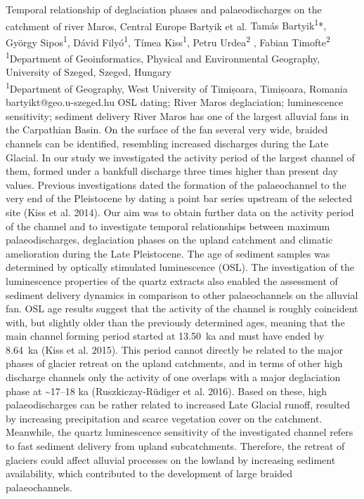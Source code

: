 \abstract
{Temporal relationship of deglaciation phases and palaeodischarges on the catchment of river Maros, Central Europe} %
{Bartyik et al.} %
{Tamás Bartyik\textsuperscript{1}*, György Sipos\textsuperscript{1}, Dávid Filyó\textsuperscript{1}, Tímea Kiss\textsuperscript{1}, Petru Urdea\textsuperscript{2} , Fabian Timofte\textsuperscript{2}} %
{\TLtag} %
{\textsuperscript{1}Department of Geoinformatics, Physical and Environmental Geography, University of Szeged, Szeged, Hungary\\
\textsuperscript{1}Department of Geography, West University of Timișoara, Timișoara, Romania
} %
{bartyikt@geo.u-szeged.hu}  %
{OSL dating; River Maros deglaciation; luminescence sensitivity; sediment delivery}%
{River Maros has one of the largest alluvial fans in the Carpathian Basin. On the surface of the fan several very wide, braided channels can be identified, resembling increased discharges during the Late Glacial. In our study we investigated the activity period of the largest channel of them, formed under a bankfull discharge three times higher than present day values. Previous investigations dated the formation of the palaeochannel to the very end of the Pleistocene by dating a point bar series upstream of the selected site (Kiss et al. 2014). Our aim was to obtain further data on the activity period of the channel and to investigate temporal relationships between maximum palaeodischarges, deglaciation phases on the upland catchment and climatic amelioration during the Late Pleistocene. The age of sediment samples was determined by optically stimulated luminescence (OSL). The investigation of the luminescence properties of the quartz extracts also enabled the assessment of sediment delivery dynamics in comparison to other palaeochannels on the alluvial fan. 
OSL age results suggest that the activity of the channel is roughly coincident with, but slightly older than the previously determined ages, meaning that the main channel forming period started at 13.50~ka and must have ended by 8.64~ka (Kiss et al. 2015). This period cannot directly be related to the major phases of glacier retreat on the upland catchments, and in terms of other high discharge channels only the activity of one overlaps with a major deglaciation phase at \textasciitilde17--18 ka (Ruszkiczay-Rüdiger et al. 2016). Based on these, high palaeodischarges can be rather related to increased Late Glacial runoff, resulted by increasing precipitation and scarce vegetation cover on the catchment. Meanwhile, the quartz luminescence sensitivity of the investigated channel refers to fast sediment delivery from upland subcatchments. Therefore, the retreat of glaciers could affect alluvial processes on the lowland by increasing sediment availability, which contributed to the development of large braided palaeochannels.
}%
